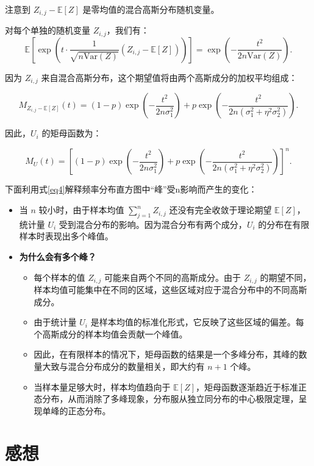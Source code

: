 \documentclass{article}
\begin{document}
注意到 \( Z_{i,j} - \mathbb{E}[Z] \) 是零均值的混合高斯分布随机变量。

对每个单独的随机变量 \( Z_{i,j} \)，我们有：
\[
\mathbb{E}\left[ \exp\left( t \cdot \frac{1}{\sqrt{n \text{Var}(Z)}} \left( Z_{i,j} - \mathbb{E}[Z] \right) \right) \right] = \exp\left( - \frac{t^2}{2n \text{Var}(Z)} \right).
\]

因为 \( Z_{i,j} \) 来自混合高斯分布，这个期望值将由两个高斯成分的加权平均组成：

\[
M_{Z_{i,j} - \mathbb{E}[Z]}(t) = (1-p) \exp\left( -\frac{t^2}{2n \sigma_1^2} \right) + p \exp\left( -\frac{t^2}{2n (\sigma_1^2 + \eta^2 \sigma_2^2)} \right).
\]

因此，\( U_i \) 的矩母函数为：

\begin{equation}
M_U(t) = \left[ (1-p) \exp\left( -\frac{t^2}{2n \sigma_1^2} \right) + p \exp\left( -\frac{t^2}{2n (\sigma_1^2 + \eta^2 \sigma_2^2)} \right) \right]^n.
\label{eq4}
\end{equation}

下面利用式\ref{eq4}解释频率分布直方图中“峰”受n影响而产生的变化：

\begin{itemize}
    \item 当 \( n \) 较小时，由于样本均值 \( \sum_{j=1}^n Z_{i,j} \) 还没有完全收敛于理论期望 \( \mathbb{E}[Z] \)，统计量 \( U_i \) 受到混合分布的影响。因为混合分布有两个成分，\( U_i \) 的分布在有限样本时表现出多个峰值。
    \item \textbf{为什么会有多个峰？}
    \begin{itemize}
        \item 每个样本的值 \( Z_{i,j} \) 可能来自两个不同的高斯成分。由于 \( Z_{i,j} \) 的期望不同，样本均值可能集中在不同的区域，这些区域对应于混合分布中的不同高斯成分。
        \item 由于统计量 \( U_i \) 是样本均值的标准化形式，它反映了这些区域的偏差。每个高斯成分的样本均值会贡献一个峰值。
        \item 因此，在有限样本的情况下，矩母函数的结果是一个多峰分布，其峰的数量大致与混合分布成分的数量相关，即大约有 \( n+1 \) 个峰。
        \item 当样本量足够大时，样本均值趋向于 \( \mathbb{E}[Z] \)，矩母函数逐渐趋近于标准正态分布，从而消除了多峰现象，分布服从独立同分布的中心极限定理，呈现单峰的正态分布。
    \end{itemize}
\end{itemize}


\section{感想}
\end{document}
